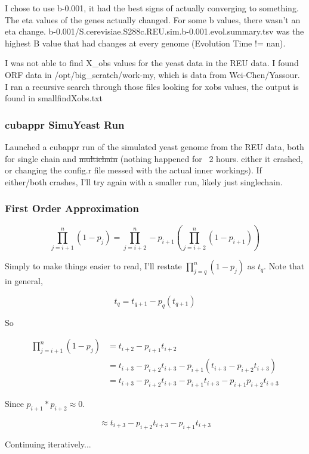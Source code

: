\documentclass[11pt]{article} %
\begin{document}
I chose to use b-0.001, it had the best signs of actually converging to something. The eta values of the genes actually changed. For some b values, there wasn't an eta change. b-0.001/S.cerevisiae.S288c.REU.sim.b-0.001.evol.summary.tsv was the highest B value that had changes at every genome (Evolution Time != nan). 

I was not able to find X\_obs values for the yeast data in the REU data. I found ORF data in /opt/big\_scratch/work-my, which is data from Wei-Chen/Yassour. I ran a recursive search through those files looking for xobs values, the output is found in smallfindXobs.txt



\subsubsection{cubappr SimuYeast Run}
Launched a cubappr run of the simulated yeast genome from the REU data, both for single chain and \sout{multichain} (nothing happened for ~2 hours. either it crashed, or changing the config.r file messed with the actual inner workings). If either/both crashes, I'll try again with a smaller run, likely just singlechain.


\subsubsection{First Order Approximation}

$$\prod_{j=i+1}^{n} (1-p_j)= \prod_{j=i+2}^{n} - p_{i+1}\left(\prod_{j=i+2}^{n}(1-p_{i+1})\right)$$

Simply to make things easier to read, I'll restate $\prod_{j=q}^{n} (1-p_j)$ as $t_q$. Note that in general,

$$t_q = t_{q+1} - p_q(t_{q+1})$$

So 

\begin{align*}
	\prod_{j=i+1}^{n} (1-p_j) &= t_{i+2} - p_{i+1}t_{i+2} \\
	&= t_{i+3} - p_{i+2}t_{i+3} - p_{i+1}\left(t_{i+3} - p_{i+2}t_{i+3}\right) \\
	&= t_{i+3} - p_{i+2}t_{i+3} - p_{i+1}t_{i+3} - p_{i+1}p_{i+2}t_{i+3}
\end{align*}

Since $p_{i+1} * p_{i+2} \approx 0$.

$$\approx t_{i+3} - p_{i+2}t_{i+3} - p_{i+1}t_{i+3}$$

Continuing iteratively...
\end{document}

